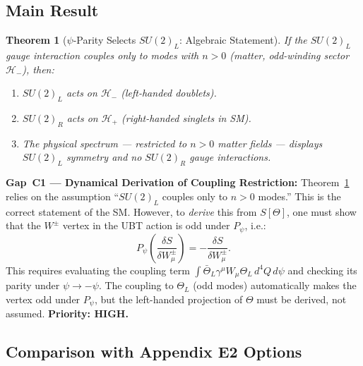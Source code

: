 \documentclass[12pt,a4paper]{article}
\newtheorem{theorem}{Theorem}[section]
\theoremstyle{definition}
\theoremstyle{remark}
\begin{document}
\subsection{Main Result}
\label{subsec:main_result}

\begin{theorem}[$\psi$-Parity Selects $SU(2)_L$: Algebraic Statement]
\label{thm:chirality_selection}
If the $SU(2)_L$ gauge interaction couples only to modes with $n>0$
(matter, odd-winding sector $\mathcal{H}_-$), then:
\begin{enumerate}
  \item[(i)] $SU(2)_L$ acts on $\mathcal{H}_-$ (left-handed doublets).
  \item[(ii)] $SU(2)_R$ acts on $\mathcal{H}_+$ (right-handed singlets in SM).
  \item[(iii)] The physical spectrum --- restricted to $n > 0$ matter fields ---
    displays $SU(2)_L$ symmetry and no $SU(2)_R$ gauge interactions.
\end{enumerate}
\end{theorem}

\begin{gapbox}
\textbf{Gap~C1 --- Dynamical Derivation of Coupling Restriction:}
Theorem~\ref{thm:chirality_selection} relies on the assumption ``$SU(2)_L$
couples only to $n>0$ modes.''  This is the correct statement of the SM.
However, to \emph{derive} this from $S[\Theta]$, one must show that the
$W^\pm$ vertex in the UBT action is odd under $P_\psi$, i.e.:
\[
  P_\psi\!\left(\frac{\delta S}{\delta W^\pm_\mu}\right) = -\frac{\delta S}{\delta W^\pm_\mu}.
\]
This requires evaluating the coupling term
$\int \bar\Theta_L \gamma^\mu W_\mu \Theta_L\, d^4Q\, d\psi$
and checking its parity under $\psi\to-\psi$.
The coupling to $\Theta_L$ (odd modes) automatically makes the vertex
odd under $P_\psi$, but the left-handed projection of $\Theta$ must be
derived, not assumed.
\textbf{Priority: HIGH.}
\end{gapbox}

\subsection{Comparison with Appendix E2 Options}
\label{subsec:comparison}
\end{document}
